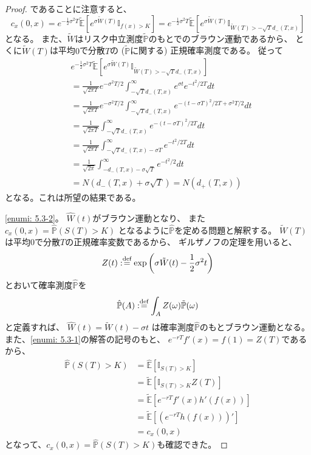 \documentclass[uplatex]{jsarticle}
\theoremstyle{definition}
\def\P{\mathbb{P}}
\def\E{\mathbb{E}}
\def\I{\mathbb{I}}
\def\dfn{:\overset{\mbox{{\scriptsize def}}}{=}}
\begin{document}
\begin{proof}
  であることに注意すると、
  \[
  c_x(0,x)
  = e^{-\frac{1}{2}\sigma^2T} \tilde{\E}\left[
  e^{\sigma\tilde{W}(T)} \I_{f(x) > K} \right]
  = e^{-\frac{1}{2}\sigma^2T} \tilde{\E}\left[
  e^{\sigma\tilde{W}(T)} \I_{\tilde{W}(T) > - \sqrt{T} d_-(T,x)} \right]
  \]
  となる。
  また、\(\tilde{W}\)はリスク中立測度\(\tilde{\P}\)のもとでのブラウン運動であるから、
  とくに\(\tilde{W}(T)\)は平均\(0\)で分散\(T\)の
  (\(\tilde{\P}\)に関する)
  正規確率測度である。
  従って
  \begin{align*}
    &e^{-\frac{1}{2}\sigma^2T} \tilde{\E}\left[
    e^{\sigma\tilde{W}(T)} \I_{\tilde{W}(T) > - \sqrt{T} d_-(T,x)} \right] \\
    &= \frac{1}{\sqrt{2\pi T}}e^{-\sigma^2T/2}
    \int_{-\sqrt{T} d_-(T,x)}^{\infty} e^{\sigma t}e^{-t^2/2T} dt \\
    &= \frac{1}{\sqrt{2\pi T}}e^{-\sigma^2T/2}
    \int_{-\sqrt{T} d_-(T,x)}^{\infty} e^{ - (t-\sigma T)^2/2T + \sigma^2T/2} dt \\
    &= \frac{1}{\sqrt{2\pi T}}
    \int_{-\sqrt{T} d_-(T,x)}^{\infty} e^{ - (t-\sigma T)^2/2T} dt \\
    &= \frac{1}{\sqrt{2\pi T}}
    \int_{-\sqrt{T} d_-(T,x) - \sigma T}^{\infty} e^{-t^2/2T} dt \\
    &= \frac{1}{\sqrt{2\pi}}
    \int_{-d_-(T,x) - \sigma \sqrt{T}}^{\infty} e^{-t^2/2} dt \\
    &= N(d_-(T,x) + \sigma \sqrt{T})
    = N(d_+(T,x))
  \end{align*}
  となる。これは所望の結果である。

  \ref{enumi: 5.3-2}。
  \(\hat{W}(t)\)がブラウン運動となり、
  また\(c_x(0,x) = \hat{\P}(S(T)>K)\)
  となるように\(\hat{\P}\)を定める問題と解釈する。
  \(\tilde{W}(T)\)は平均\(0\)で分散\(T\)の正規確率変数であるから、
  ギルザノフの定理を用いると、
  \[
  Z(t) \dfn \exp \left( \sigma \tilde{W}(t) - \frac{1}{2}\sigma^2t\right)
  \]
  とおいて確率測度\(\hat{\P}\)を
  \[
  \hat{\P}(A) \dfn \int_AZ(\omega)\tilde{\P}(\omega)
  \]
  と定義すれば、
  \(\hat{W}(t) = \tilde{W}(t) - \sigma t\)
  は確率測度\(\hat{\P}\)のもとブラウン運動となる。
  また、\ref{enumi: 5.3-1}の解答の記号のもと、
  \(e^{-rT}f'(x) = f(1) = Z(T)\)であるから、
  \begin{align*}
    \hat{\P}(S(T)>K) &= \hat{\E}\left[\I_{S(T) > K}\right] \\
    &= \tilde{\E}\left[\I_{S(T) > K}Z(T)\right] \\
    &= \tilde{\E}\left[e^{-rT}f'(x)h'(f(x))\right] \\
    &= \tilde{\E}\left[\left(e^{-rT}h(f(x))\right)'\right] \\
    &= c_x(0,x)
  \end{align*}
  となって、\(c_x(0,x) = \hat{\P}(S(T)>K)\)も確認できた。


\end{proof}
\end{document}
